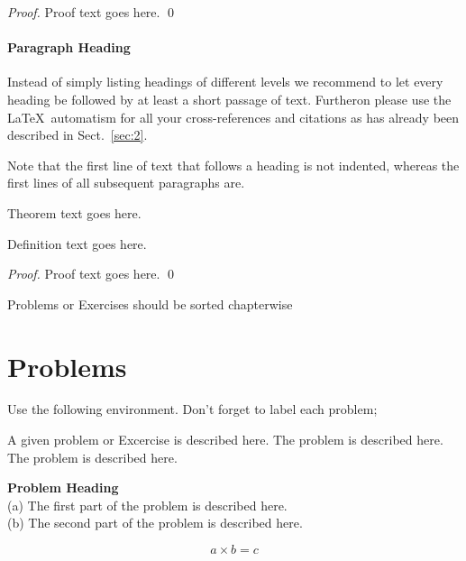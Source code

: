 \begin{proof}
Proof text goes here.
\qed
\end{proof}

\paragraph{Paragraph Heading} %
Instead of simply listing headings of different levels we recommend to let every heading be followed by at least a short passage of text. Furtheron please use the \LaTeX\ automatism for all your cross-references and citations as has already been described in Sect.~\ref{sec:2}.

Note that the first line of text that follows a heading is not indented, whereas the first lines of all subsequent paragraphs are.
%
%
\begin{theorem}
Theorem text goes here.
\end{theorem}
%
\begin{definition}
Definition text goes here.
\end{definition}
%
\begin{proof}
\smartqed
Proof text goes here.
\qed
\end{proof}
%

 Problems or Exercises should be sorted chapterwise
\section*{Problems}

 Use the following environment.
 Don't forget to label each problem;
\begin{prob}
\label{prob1}
A given problem or Excercise is described here. The
problem is described here. The problem is described here.
\end{prob}

\begin{prob}
\label{prob2}
\textbf{Problem Heading}\\
(a) The first part of the problem is described here.\\
(b) The second part of the problem is described here.
\end{prob}



\begin{equation}
a \times b = c
\end{equation}




